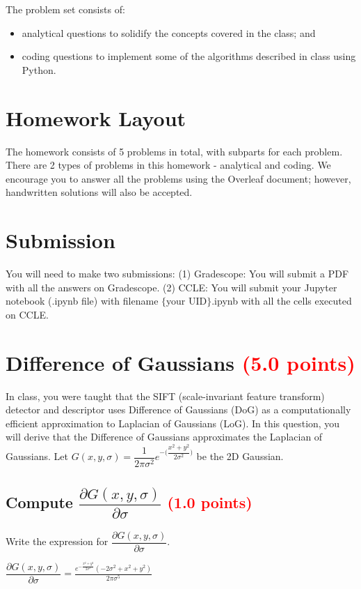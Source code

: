 \documentclass[answers]{exam}
\newcommand{\mypoints}[1]{\textcolor{red}{(#1 points)}}
\begin{document}
The problem set consists of: 
\begin{itemize}
    \item analytical questions to solidify the concepts covered in the class; and
    \item coding questions to implement some of the algorithms described in class using Python.
\end{itemize}

\section*{Homework Layout}
The homework consists of 5 problems in total, with subparts for each problem. There are 2 types of problems in this homework - analytical and coding. We encourage you to answer all the problems using the Overleaf document; however, handwritten solutions will also be accepted.

\section*{Submission}

You will need to make two submissions: (1) Gradescope: You will submit a PDF with all the answers on Gradescope. (2) CCLE: You will submit your Jupyter notebook (.ipynb file) with filename $\{$your UID$\}$.ipynb with all the cells executed on CCLE. 


\newpage
\section{Difference of Gaussians \mypoints{5.0}}
In class, you were taught that the SIFT (scale-invariant feature transform) detector and descriptor uses Difference of Gaussians (DoG) as a computationally efficient approximation to Laplacian of Gaussians (LoG). In this question, you will derive that the Difference of Gaussians approximates the Laplacian of Gaussians. Let $G(x,y, \sigma) = \dfrac{1}{2\pi \sigma^2} e^{-\big(\dfrac{x^2+y^2}{2\sigma^2}\big)}$ be the 2D Gaussian.

\subsection{Compute $\dfrac{\partial G(x,y,\sigma)}{\partial \sigma}$ \mypoints{1.0}}
Write the expression for $\dfrac{\partial G(x,y,\sigma)}{\partial \sigma}$.
 
\begin{solution}
$
    \dfrac{\partial G(x,y,\sigma)}{\partial \sigma}=\frac{e^{-\frac{x^2+y^2}{2 \sigma ^2}} \left(-2 \sigma ^2+x^2+y^2\right)}{2 \pi  \sigma ^5}
$
\end{solution}
\end{document}

